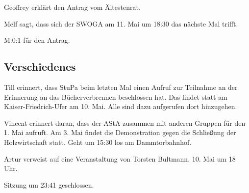 \documentclass[ngerman,headheight=70pt]{scrartcl}
\begin{document}
    Geoffrey erklärt den Antrag vom Ältestenrat.

    Melf sagt, dass sich der SWOGA am 11. Mai um 18:30 das nächste Mal
    trifft.

    M:0:1 für den Antrag.

    \subsection{Verschiedenes}

    Till erinnert, dass StuPa beim letzten Mal einen Aufruf zur Teilnahme
    an der Erinnerung an das Bücherverbrennen beschlossen hat. Das findet
    statt am Kaiser-Friedrich-Ufer am 10. Mai. Alle sind dazu aufgerufen
    dort hinzugehen.

    Vincent erinnert daran, dass der AStA zusammen mit anderen Gruppen
    für den 1. Mai aufruft. Am 3. Mai findet die Demonstration gegen
    die Schließung der Holzwirtschaft statt. Geht um 15:30 los am Dammtorbahnhof.

    Artur verweist auf eine Veranstaltung von Torsten Bultmann. 10. Mai um 18 Uhr.

    Sitzung um 23:41 geschlossen.
\end{document}
